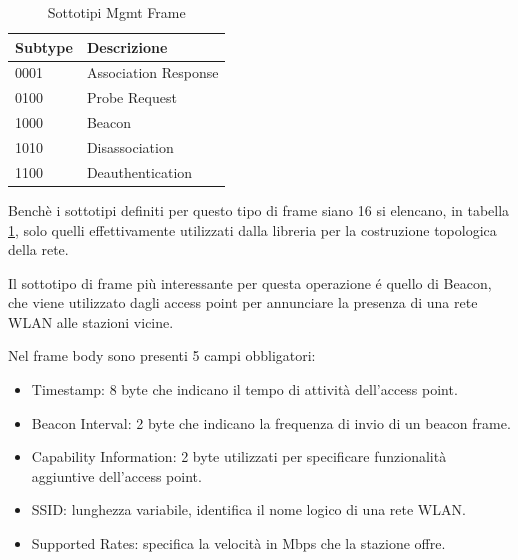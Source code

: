 \begin{table}
\centering
\begin{tabular}{| l | l |}
	\hline
	Subtype  & Descrizione \\ \hline
	0001	 & Association Response 	\\ \hline
	0100	 & Probe Request \\ \hline
	1000 &	Beacon \\ \hline
	1010	& Disassociation \\ \hline
	1100	& Deauthentication \\ \hline
\end{tabular}
\centering
\caption{Sottotipi Mgmt Frame}
\label{table:managementframes}
\end{table}

Bench\`e i sottotipi definiti per questo tipo di frame siano 16 si elencano, in tabella \ref{table:managementframes}, solo quelli effettivamente utilizzati dalla libreria per la costruzione topologica della rete.

Il sottotipo di frame pi\`u interessante per questa operazione \'e quello di Beacon, che viene utilizzato dagli access point per annunciare la presenza di una rete WLAN alle stazioni vicine.

Nel frame body sono presenti 5 campi obbligatori:

\begin{itemize}
	\item Timestamp: 8 byte che indicano il tempo di attivit\`a dell'access point.
	\item Beacon Interval: 2 byte che indicano la frequenza di invio di un beacon frame.
	\item Capability Information: 2 byte utilizzati per specificare 
	funzionalit\`a aggiuntive dell'access point.
	\item	SSID: lunghezza variabile, identifica il nome logico di una rete WLAN.
	\item Supported Rates: specifica la velocit\`a in Mbps che la stazione offre.
\end{itemize}

